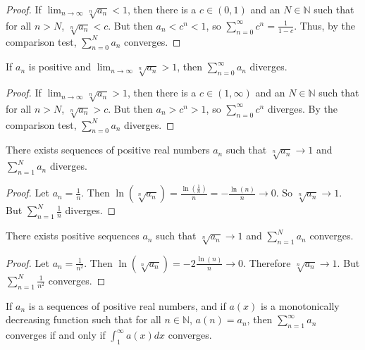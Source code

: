 \documentclass[crop=false,class=book,oneside]{standalone}
\begin{document}
\begin{proof}
If $\lim_{n\rightarrow \infty}\sqrt[n]{a_n}<1$, then there is a $c\in (0,1)$ and an $N\in \mathbb{N}$ such that for all $n>N$, $\sqrt[n]{a_n}<c$. But then $a_n<c^n<1$, so $\sum_{n=0}^{\infty}c^n = \frac{1}{1-c}$. Thus, by the comparison test, $\sum_{n=0}^{N}a_n$ converges.
\end{proof}
\begin{theorem*}
If $a_n$ is positive and $\lim_{n\rightarrow \infty} \sqrt[n]{a_n}>1$, then $\sum_{n=0}^{\infty} a_n$ diverges.
\end{theorem*}
\begin{proof}
If $\lim_{n\rightarrow \infty}\sqrt[n]{a_n}>1$, then there is a $c\in (1,\infty)$ and an $N\in \mathbb{N}$ such that for all $n>N$, $\sqrt[n]{a_n}>c$. But then $a_n>c^n>1$, so $\sum_{n=0}^{\infty}c^n$ diverges. By the comparison test, $\sum_{n=0}^{N}a_n$ diverges.
\end{proof}
\begin{theorem*}
There exists sequences of positive real numbers $a_n$ such that $\sqrt[n]{a_n} \rightarrow 1$ and $\sum_{n=1}^{N} a_n$ diverges.
\end{theorem*}
\begin{proof}
Let $a_n = \frac{1}{n}$. Then $\ln(\sqrt[n]{a_n}) = \frac{\ln(\frac{1}{n})}{n} = -\frac{\ln(n)}{n} \rightarrow 0$. So $\sqrt[n]{a_n} \rightarrow 1$. But $\sum_{n=1}^{N} \frac{1}{n}$ diverges.
\end{proof}
\begin{theorem*}
There exists positive sequences $a_{n}$ such that $\sqrt[n]{a_n} \rightarrow 1$ and $\sum_{n=1}^{N}a_n$ converges.
\end{theorem*}
\begin{proof}
Let $a_{n}=\frac{1}{n^2}$. Then $\ln(\sqrt[n]{a_n})=-2\frac{\ln(n)}{n}\rightarrow 0$. Therefore $\sqrt[n]{a_n}\rightarrow 1$. But $\sum_{n=1}^{N}\frac{1}{n^2}$ converges.
\end{proof}
\begin{theorem*}
If $a_n$ is a sequences of positive real numbers, and if $a(x)$ is a monotonically decreasing function such that for all $n\in \mathbb{N}$, $a(n) = a_n$, then $\sum_{n=1}^{\infty} a_n$ converges if and only if $\int_{1}^{\infty} a(x)dx$ converges.
\end{theorem*}
\end{document}
